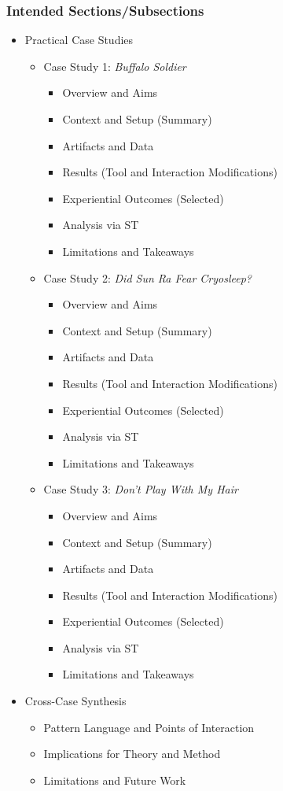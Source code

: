\subsubsection{Intended Sections/Subsections}
\begin{itemize}[nosep]
	\item Practical Case Studies
	\begin{itemize}[nosep]
		\item Case Study 1: \textit{Buffalo Soldier}
			\begin{itemize}[nosep]
				\item Overview and Aims
				\item Context and Setup (Summary)
				\item Artifacts and Data
				\item Results (Tool and Interaction Modifications)
				\item Experiential Outcomes (Selected)
				\item Analysis via ST
				\item Limitations and Takeaways
			\end{itemize}
		\item Case Study 2: \textit{Did Sun Ra Fear Cryosleep?}
			\begin{itemize}[nosep]
				\item Overview and Aims
				\item Context and Setup (Summary)
				\item Artifacts and Data
				\item Results (Tool and Interaction Modifications)
				\item Experiential Outcomes (Selected)
				\item Analysis via ST
				\item Limitations and Takeaways
			\end{itemize}
		\item Case Study 3: \textit{Don't Play With My Hair}
			\begin{itemize}[nosep]
				\item Overview and Aims
				\item Context and Setup (Summary)
				\item Artifacts and Data
				\item Results (Tool and Interaction Modifications)
				\item Experiential Outcomes (Selected)
				\item Analysis via ST
				\item Limitations and Takeaways
			\end{itemize}
	\end{itemize}
	\item Cross-Case Synthesis
	\begin{itemize}[nosep]
		\item Pattern Language and Points of Interaction
		\item Implications for Theory and Method
		\item Limitations and Future Work
	\end{itemize}
\end{itemize}


